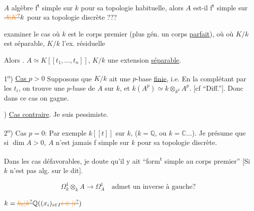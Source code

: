$A$ algèbre  f\textsuperscript{t} simple sur $k$ pour sa topologie habituelle, alors $A$ est-il f\textsuperscript{t} simple sur $\deleted{\unsure{A|K}}k$ pour sa topologie discrète ???

  examiner le cas où $k$ est le corps premier (plus gén. un corps \uline{parfait}), où  où $K/k$ est séparable, $K/k$ l'ex. résiduelle

 Alors . $A\simeq K[[t_1,\ldots,t_n]]$, $K/k$ une extension \uline{séparable}. 

1\textsuperscript{o}) \uline{Cas $p>0$}   Supposons que $K/k$ ait une $p$-base \uline{finie}, i.e.   En la complétant par les $t_i$, on trouve une $p$-base de $A$ sur $k$, et $k(A^p)\simeq k\otimes_{k^p}A^p$. [cf ``Diff.'']. Donc dans ce cas on gagne.

) \uline{Cas contraire}. Je suis pessimiste.

2\textsuperscript{o}) Cas $p=0$: Par exemple $k[[t]]$ sur $k$, ($k=\mathbb{Q}$, ou $k=\mathbb{C}\ldots$). Je présume que si $\dim A>0$, $A$ n'est jamais f simple sur $k$ pour sa topologie discrète.

Dans les cas défavorables, je doute qu'il y ait  ``form\textsuperscript{t} simple  au corps premier'' [Si $k$ n'est pas alg. sur le dit].

\[ \Omega^1_k\otimes_k A\longrightarrow\Omega^1_A\quad \text{admet un inverse à gauche?} \]

 $k=\deleted{\unsure{k_0|k}}\mathbb{Q}((x_i)_{i\in I}\deleted{\unsure{i\in|i}})$ 

